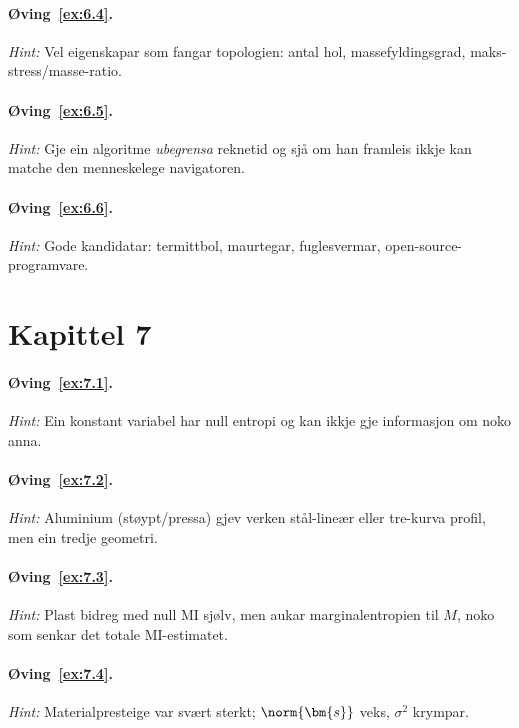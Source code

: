 \paragraph{Øving~\ref{ex:6.4}.}
\emph{Hint:} Vel eigenskapar som fangar topologien: antal hol,
massefyldingsgrad, maks-stress/masse-ratio.

\paragraph{Øving~\ref{ex:6.5}.}
\emph{Hint:} Gje ein algoritme \emph{ubegrensa} reknetid og sjå
om han framleis ikkje kan matche den menneskelege navigatoren.

\paragraph{Øving~\ref{ex:6.6}.}
\emph{Hint:} Gode kandidatar: termittbol, maurtegar,
fuglesvermar, open-source-programvare.


\section*{Kapittel 7}

\paragraph{Øving~\ref{ex:7.1}.}
\emph{Hint:} Ein konstant variabel har null entropi og kan ikkje
gje informasjon om noko anna.

\paragraph{Øving~\ref{ex:7.2}.}
\emph{Hint:} Aluminium (støypt/pressa) gjev verken stål-lineær
eller tre-kurva profil, men ein tredje geometri.

\paragraph{Øving~\ref{ex:7.3}.}
\emph{Hint:} Plast bidreg med null MI sjølv, men aukar
marginalentropien til $M$, noko som senkar det totale MI-estimatet.

\paragraph{Øving~\ref{ex:7.4}.}
\emph{Hint:} Materialpresteige var svært sterkt; $\norm{\bm{s}}$
veks, $\sigma^2$ krympar.

